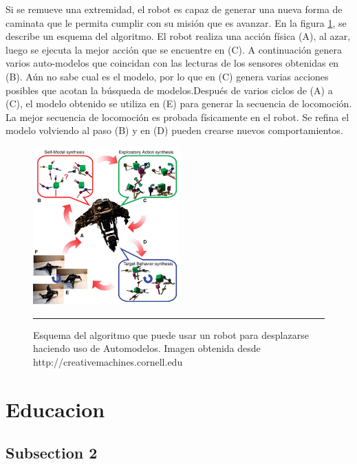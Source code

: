 Si se remueve una extremidad, el robot es capaz de generar una nueva forma de caminata que le permita cumplir con su misión que es avanzar.
En la figura \ref{fig:AutomodeladoLIPSON}, se describe un esquema del algoritmo. El robot realiza una acción física (A), al azar, luego se ejecuta la mejor acción que se encuentre en (C). A continuación genera varios auto-modelos que coincidan con las lecturas de los sensores obtenidas en (B). Aún no sabe cual es el modelo, por lo que en (C) genera varias acciones posibles que acotan la búsqueda de modelos.Después de varios ciclos de (A) a (C),  el modelo obtenido se utiliza en (E) para generar la secuencia de locomoción. La mejor secuencia de locomoción es probada físicamente en el robot. Se refina el modelo volviendo al paso (B) y en (D) pueden crearse nuevos comportamientos.

\begin{figure}[htbp]
	\centering
		\includegraphics[width=0.5\textwidth]{./Figures/algoritmo_automodelo.png}
		\rule{35em}{0.5pt}
	\caption[AutomodeladoLIPSON]{Esquema del algoritmo que puede usar un robot para desplazarse haciendo uso de Automodelos. Imagen obtenida desde http://creativemachines.cornell.edu}
	\label{fig:AutomodeladoLIPSON}
\end{figure}


\section{Educacion}


\subsection{Subsection 2}

